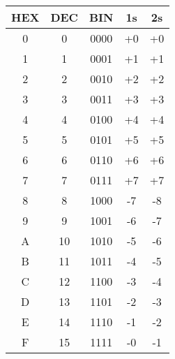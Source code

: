 \begin{tabular*}{\linewidth}{@{\extracolsep{\fill}}ccccc}
    \toprule
    HEX        & DEC & BIN           & 1s   & 2s   \\
    \midrule
    {0} & 0   & {0000} & +0 & +0 \\
    {1} & 1   & {0001} & +1 & +1 \\
    {2} & 2   & {0010} & +2 & +2 \\
    {3} & 3   & {0011} & +3 & +3 \\
    {4} & 4   & {0100} & +4 & +4 \\
    {5} & 5   & {0101} & +5 & +5 \\
    {6} & 6   & {0110} & +6 & +6 \\
    {7} & 7   & {0111} & +7 & +7 \\
    {8} & 8   & {1000} & -7 & -8 \\
    {9} & 9   & {1001} & -6 & -7 \\
    {A} & 10  & {1010} & -5 & -6 \\
    {B} & 11  & {1011} & -4 & -5 \\
    {C} & 12  & {1100} & -3 & -4 \\
    {D} & 13  & {1101} & -2 & -3 \\
    {E} & 14  & {1110} & -1 & -2 \\
    {F} & 15  & {1111} & -0 & -1 \\
    \bottomrule
\end{tabular*}
